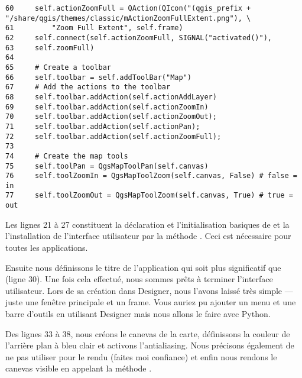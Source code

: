 \begin{verbatim}
60     self.actionZoomFull = QAction(QIcon("(qgis_prefix + "/share/qgis/themes/classic/mActionZoomFullExtent.png"), \
61         "Zoom Full Extent", self.frame)
62     self.connect(self.actionZoomFull, SIGNAL("activated()"),
63     self.zoomFull)
64 
65     # Create a toolbar
66     self.toolbar = self.addToolBar("Map")
67     # Add the actions to the toolbar
68     self.toolbar.addAction(self.actionAddLayer)
69     self.toolbar.addAction(self.actionZoomIn)
70     self.toolbar.addAction(self.actionZoomOut);
71     self.toolbar.addAction(self.actionPan);
72     self.toolbar.addAction(self.actionZoomFull);
73 
74     # Create the map tools
75     self.toolPan = QgsMapToolPan(self.canvas)
76     self.toolZoomIn = QgsMapToolZoom(self.canvas, False) # false = in
77     self.toolZoomOut = QgsMapToolZoom(self.canvas, True) # true = out
\end{verbatim}

Les lignes 21 \`a 27 constituent la d\'eclaration et l'initialisation basiques de \classname{MainWindow} et la l'installation de l'interface utilisateur par la m\'ethode \method{setupUi}. Ceci est n\'ecessaire pour toutes les applications.

Ensuite nous d\'efinissons le titre de l'application qui soit plus significatif que \usertext{MainWindow} (ligne 30). Une fois cela effectu\'e, nous sommes pr\^ets \`a terminer l'interface utilisateur. Lors de sa cr\'eation dans Designer, nous l'avons laiss\'e tr\`es simple --- juste une fen\^etre principale et un frame. Vous auriez pu ajouter un menu et une barre d'outils en utilisant Designer mais nous allons le faire avec Python.

Des lignes 33 \`a 38, nous cr\'eons le canevas de la carte, d\'efinissons la couleur de l'arri\`ere plan \`a bleu clair et activons l'antialiasing. Nous pr\'ecisons \'egalement de ne pas utiliser \classname{QImage} pour le rendu (faites moi confiance) et enfin nous rendons le canevas visible en appelant la m\'ethode \method{show}.

